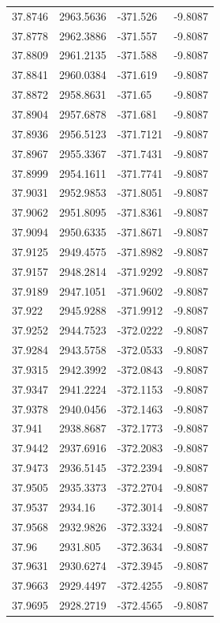 \begin{table}[H]
\begin{tabular}{llll}
37.8746 & 2963.5636 & -371.526 & -9.8087 \\
37.8778 & 2962.3886 & -371.557 & -9.8087 \\
37.8809 & 2961.2135 & -371.588 & -9.8087 \\
37.8841 & 2960.0384 & -371.619 & -9.8087 \\
37.8872 & 2958.8631 & -371.65 & -9.8087 \\
37.8904 & 2957.6878 & -371.681 & -9.8087 \\
37.8936 & 2956.5123 & -371.7121 & -9.8087 \\
37.8967 & 2955.3367 & -371.7431 & -9.8087 \\
37.8999 & 2954.1611 & -371.7741 & -9.8087 \\
37.9031 & 2952.9853 & -371.8051 & -9.8087 \\
37.9062 & 2951.8095 & -371.8361 & -9.8087 \\
37.9094 & 2950.6335 & -371.8671 & -9.8087 \\
37.9125 & 2949.4575 & -371.8982 & -9.8087 \\
37.9157 & 2948.2814 & -371.9292 & -9.8087 \\
37.9189 & 2947.1051 & -371.9602 & -9.8087 \\
37.922 & 2945.9288 & -371.9912 & -9.8087 \\
37.9252 & 2944.7523 & -372.0222 & -9.8087 \\
37.9284 & 2943.5758 & -372.0533 & -9.8087 \\
37.9315 & 2942.3992 & -372.0843 & -9.8087 \\
37.9347 & 2941.2224 & -372.1153 & -9.8087 \\
37.9378 & 2940.0456 & -372.1463 & -9.8087 \\
37.941 & 2938.8687 & -372.1773 & -9.8087 \\
37.9442 & 2937.6916 & -372.2083 & -9.8087 \\
37.9473 & 2936.5145 & -372.2394 & -9.8087 \\
37.9505 & 2935.3373 & -372.2704 & -9.8087 \\
37.9537 & 2934.16 & -372.3014 & -9.8087 \\
37.9568 & 2932.9826 & -372.3324 & -9.8087 \\
37.96 & 2931.805 & -372.3634 & -9.8087 \\
37.9631 & 2930.6274 & -372.3945 & -9.8087 \\
37.9663 & 2929.4497 & -372.4255 & -9.8087 \\
37.9695 & 2928.2719 & -372.4565 & -9.8087 \\

\end{tabular}
\end{table}
